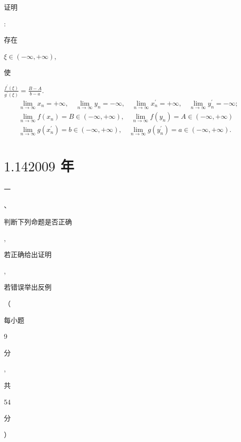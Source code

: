 \documentclass[10pt]{article}
\begin{document}
\begin{CJK}{UTF8}{mj}证明\end{CJK}: \begin{CJK}{UTF8}{mj}存在\end{CJK} $\xi \in(-\infty,+\infty)$, \begin{CJK}{UTF8}{mj}使\end{CJK} $\frac{f^{\prime}(\xi)}{g^{\prime}(\xi)}=\frac{B-A}{b-a}$.
$$
\begin{aligned}
& \lim _{n \rightarrow \infty} x_{n}=+\infty, \quad \lim _{n \rightarrow \infty} y_{n}=-\infty, \quad \lim _{n \rightarrow \infty} x_{n}^{\prime}=+\infty, \quad \lim _{n \rightarrow \infty} y_{n}^{\prime}=-\infty \text {; } \\
& \lim _{n \rightarrow \infty} f\left(x_{n}\right)=B \in(-\infty,+\infty), \quad \lim _{n \rightarrow \infty} f\left(y_{n}\right)=A \in(-\infty,+\infty) \\
& \lim _{n \rightarrow \infty} g\left(x_{n}^{\prime}\right)=b \in(-\infty,+\infty), \quad \lim _{n \rightarrow \infty} g\left(y_{n}^{\prime}\right)=a \in(-\infty,+\infty) . 
\end{aligned}
$$

\section{$1.142009$ 年}
\begin{CJK}{UTF8}{mj}一\end{CJK}、\begin{CJK}{UTF8}{mj}判断下列命题是否正确\end{CJK}, \begin{CJK}{UTF8}{mj}若正确给出证明\end{CJK}, \begin{CJK}{UTF8}{mj}若错误举出反例\end{CJK}（\begin{CJK}{UTF8}{mj}每小题\end{CJK} 9 \begin{CJK}{UTF8}{mj}分\end{CJK}, \begin{CJK}{UTF8}{mj}共\end{CJK} 54 \begin{CJK}{UTF8}{mj}分\end{CJK}）
\end{document}
